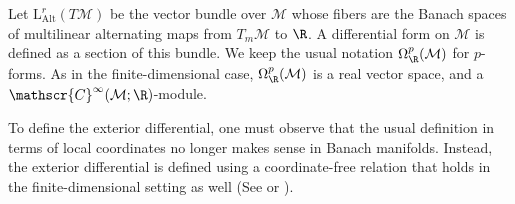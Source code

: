 
Let \(\mathrm{L}_{\mathrm{Alt}}^r(T\mathcal{M})\) be the vector bundle over \(\mathcal{M}\) whose fibers are the Banach spaces of multilinear alternating maps from \(T_m\mathcal{M}\) to \(\R\). A differential form on \(\mathcal{M}\) is defined as a section of this bundle. We keep the usual notation \(\Omega^p_\R(\mathcal{M})\) for \(p\)-forms. As in the finite-dimensional case, \(\Omega_\R^p(\mathcal{M})\) is a real vector space, and a \(\mathscr{C}^\infty(\mathcal{M};\R)\)-module. 

To define the exterior differential, one must observe that the usual definition in terms of local coordinates no longer makes sense in Banach manifolds. Instead, the exterior differential is defined using a coordinate-free relation that holds in the finite-dimensional setting as well (See \parencite[Prop. E.3]{Schmeding_2022} or \parencite[Prop. 3.2]{SergeLang}).

